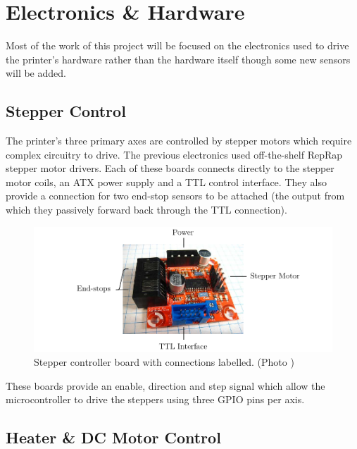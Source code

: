 	
	\section{Electronics \& Hardware}
		
		Most of the work of this project will be focused on the electronics used to
		drive the printer's hardware rather than the hardware itself though some
		new sensors will be added.
		
		\subsection{Stepper Control}
			
			
			The printer's three primary axes are controlled by stepper motors which require
			complex circuitry to drive. The previous electronics used off-the-shelf RepRap
			stepper motor drivers\cite{stepperMotorDriver23}. Each of these boards
			connects directly to the stepper motor coils, an ATX power supply and a
			TTL control interface. They also provide a connection for two end-stop
			sensors to be attached (the output from which they passively forward back
			through the TTL connection).
			
			\begin{figure}[here]
				\includegraphics[width=1\textwidth]{diagrams/stepperControllerBoard.pdf}
				\caption{Stepper controller board with connections labelled. (Photo \cite{stepperControllerBoardPhoto})}
				\label{fig:stepperControllerBoard}
			\end{figure}
			
			These boards provide an enable, direction and step signal which allow
			the microcontroller to drive the steppers using three GPIO pins per axis.
		
		\subsection{Heater \& DC Motor Control}
			
